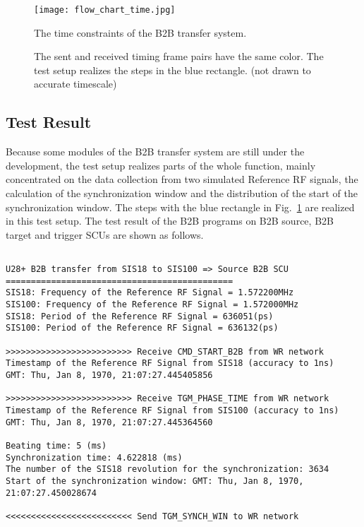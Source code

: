 \begin{landscape}
\begin{figure}[!htb]
   \centering   
   \texttt{[image: flow\_chart\_time.jpg]}
   \caption{The time constraints of the B2B transfer system.}
   \caption*{The sent and received timing frame pairs have the same color. The test setup realizes the steps in the blue rectangle. (not drawn to accurate timescale) }
   \label{time_constraint}
\end{figure}
\end{landscape}

\subsection{Test Result}
Because some modules of the B2B transfer system are still under the development, the test setup realizes parts of the whole function, mainly concentrated on the data collection from two simulated Reference RF signals, the calculation of the synchronization window and the distribution of the start of the synchronization window. The steps with the blue rectangle in Fig.~\ref{time_constraint} are realized in this test setup. The test result of the B2B programs on B2B source, B2B target and trigger SCUs are shown as follows. 

\begin{lstlisting}[language={[ANSI]C}, keywordstyle=\color{blue!70}, commentstyle=\color{red!50!green!50!blue!50}, frame=shadowbox, rulesepcolor=\color{red!20!green!20!blue!20}]

U28+ B2B transfer from SIS18 to SIS100 => Source B2B SCU
=============================================
SIS18: Frequency of the Reference RF Signal = 1.572200MHz
SIS100: Frequency of the Reference RF Signal = 1.572000MHz 
SIS18: Period of the Reference RF Signal = 636051(ps)
SIS100: Period of the Reference RF Signal = 636132(ps)

>>>>>>>>>>>>>>>>>>>>>>>>> Receive CMD_START_B2B from WR network
Timestamp of the Reference RF Signal from SIS18 (accuracy to 1ns)
GMT: Thu, Jan 8, 1970, 21:07:27.445405856

>>>>>>>>>>>>>>>>>>>>>>>>> Receive TGM_PHASE_TIME from WR network
Timestamp of the Reference RF Signal from SIS100 (accuracy to 1ns)
GMT: Thu, Jan 8, 1970, 21:07:27.445364560

Beating time: 5 (ms)
Synchronization time: 4.622818 (ms)
The number of the SIS18 revolution for the synchronization: 3634
Start of the synchronization window: GMT: Thu, Jan 8, 1970, 21:07:27.450028674

<<<<<<<<<<<<<<<<<<<<<<<<< Send TGM_SYNCH_WIN to WR network
\end{lstlisting}

